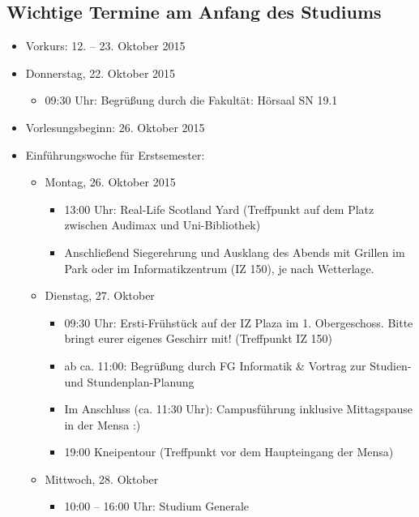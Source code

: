 \subsection{Wichtige Termine am Anfang des Studiums}


\renewcommand{\labelitemi}{$\bullet$}
\renewcommand{\labelitemii}{$\bullet$}
\renewcommand{\labelitemiii}{$\bullet$}
\renewcommand{\labelitemiv}{$\bullet$}

\begin{itemize}
\item Vorkurs: 12. – 23. Oktober 2015
\item Donnerstag, 22. Oktober 2015
\begin{itemize}
\item 09:30 Uhr: Begrüßung durch die Fakultät: Hörsaal SN 19.1
\end{itemize}
\item Vorlesungsbeginn: 26. Oktober 2015
\item Einführungswoche für Erstsemester:
\begin{itemize}
\item Montag, 26. Oktober 2015
\begin{itemize}
\item 13:00 Uhr: Real-Life Scotland Yard (Treffpunkt auf dem Platz zwischen Audimax und Uni-Bibliothek)
\item Anschließend Siegerehrung und Ausklang des Abends mit Grillen im Park oder im Informatikzentrum (IZ 150), je nach Wetterlage.
\end{itemize}
\item Dienstag, 27. Oktober
\begin{itemize}
\item 09:30 Uhr: Ersti-Frühstück auf der IZ Plaza im 1. Obergeschoss. Bitte bringt eurer eigenes Geschirr mit! (Treffpunkt IZ 150)
\item ab ca. 11:00: Begrüßung durch FG Informatik \& Vortrag zur Studien- und Stundenplan-Planung
\item Im Anschluss (ca. 11:30 Uhr): Campusführung inklusive Mittagspause in der Mensa :)
\item 19:00 Kneipentour (Treffpunkt vor dem Haupteingang der Mensa)
\end{itemize}
\item Mittwoch, 28. Oktober
\begin{itemize}
\item 10:00 – 16:00 Uhr: Studium Generale

\end{itemize}
\end{itemize}
\end{itemize}
